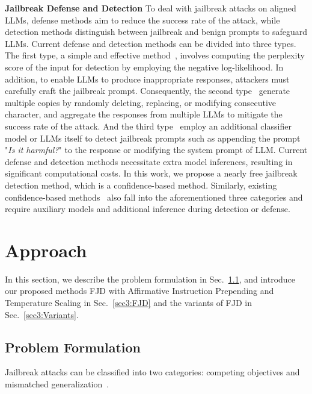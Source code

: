 \documentclass{article}
\begin{document}
\textbf{Jailbreak Defense and Detection} To deal with jailbreak attacks on aligned LLMs, defense methods aim to reduce the success rate of the attack, while detection methods distinguish between jailbreak and benign prompts to safeguard LLMs. Current defense and detection methods can be divided into three types. The first type, a simple and effective method~\citep{alon2023detecting, jain2023baseline}, involves computing the perplexity score of the input for detection by employing the negative log-likelihood. In addition, to enable LLMs to produce inappropriate responses, attackers must carefully craft the jailbreak prompt. Consequently, the second type~\citep{robey2023smoothllm, zhang2023mutation, cao2023defending, zhang2023defending, kumar2023certifying, rao2023tricking} generate multiple copies by randomly deleting, replacing, or modifying consecutive character, and aggregate the responses from multiple LLMs to mitigate the success rate of the attack. And the third type~\citep{yuan2024rigorllm, helbling2023llm, xie2023defending} employ an additional classifier model or LLMs itself to detect jailbreak prompts such as appending the prompt "\textit{Is it harmful?}" to the response or modifying the system prompt of LLM. Current defense and detection methods necessitate extra model inferences, resulting in significant computational costs. In this work, we propose a nearly free jailbreak detection method, which is a confidence-based method. Similarly, existing confidence-based methods~\citep{xu2024safedecoding, candogan2025single} also fall into the aforementioned three categories and require auxiliary models and additional inference during detection or defense.

\section{Approach}\label{FJD}

In this section, we describe the problem formulation in Sec.~\ref{sec3:Prom}, and introduce our proposed methods FJD with Affirmative Instruction Prepending and Temperature Scaling in Sec.~\ref{sec3:FJD} and the variants of FJD in Sec.~\ref{sec3:Variants}.


\subsection{Problem Formulation}\label{sec3:Prom}


Jailbreak attacks can be classified into two categories: competing objectives and mismatched generalization~\citep{wei2024jailbroken}.
\end{document}
